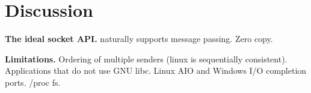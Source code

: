 \section{Discussion}
\label{sec:discussion}

\textbf{The ideal socket API.} \sys{} naturally supports message passing. Zero copy.

\textbf{Limitations.}
Ordering of multiple senders (linux is sequentially consistent). Applications that do not use GNU libc. Linux AIO and Windows I/O completion ports. /proc fs.